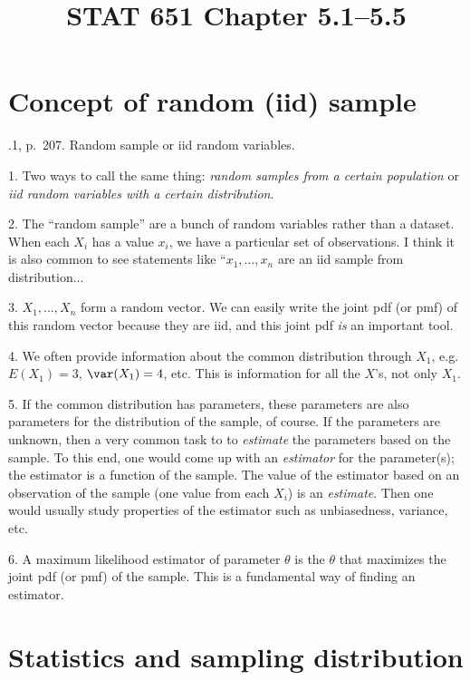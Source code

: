 \documentclass[12pt]{article}
\begin{document}
\title{STAT 651 Chapter 5.1--5.5}
\maketitle

\section{Concept of random (iid) sample}

.1, p.~207. Random sample or iid random variables.

\alert%
1. Two ways to call the same thing: \emph{random samples from a certain
population} or \emph{iid random variables with a certain distribution}.

2. The ``random sample'' are a bunch of random variables rather than a
dataset. When each $X_i$ has a value $x_i$, we have a particular set of
observations. I think it is also common to see statements like
``$x_1,\dotsc,x_n$ are an iid sample from distribution...

3. $X_1,\dotsc, X_n$ form a random vector.
We can easily write the joint pdf (or pmf) of this random vector because they
are iid, and this joint pdf \emph{is} an important tool.

4. We often provide information about the common distribution through
$X_1$, e.g.\@ $E(X_1) = 3$, $\var(X_1) = 4$, etc.
This is information for all the $X$'s, not only $X_1$.

5. If the common distribution has parameters, these parameters are also
parameters for the distribution of the sample, of course.
If the parameters are unknown, then a very common task to to
\emph{estimate} the parameters based on the sample.
To this end, one would come up with an \emph{estimator}
for the parameter(s); the estimator is a function of the sample.
The value of the estimator based on an observation of the sample
(one value from each $X_i$) is an \emph{estimate}.
Then one would usually study properties of the estimator such as
unbiasedness, variance, etc.

6. A maximum likelihood estimator of parameter $\theta$
is the $\theta$ that maximizes the joint pdf (or pmf) of the sample.
This is a fundamental way of finding an estimator.

\section{Statistics and sampling distribution}
\end{document}
